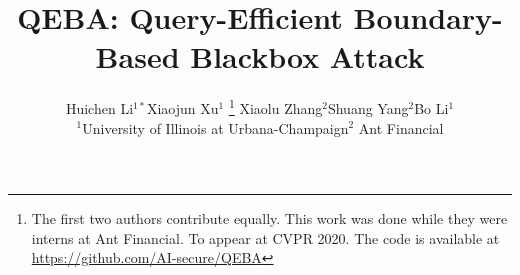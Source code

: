 \documentclass[10pt,twocolumn,letterpaper]{article}
\begin{document}
\title{QEBA: Query-Efficient Boundary-Based Blackbox Attack}
\author{Huichen Li$^{1*}$\quad Xiaojun Xu$^{1}$
\thanks{The first two authors contribute equally. This work was done while they were interns at Ant Financial. To appear at CVPR 2020. The code is available at \url{https://github.com/AI-secure/QEBA}} %
\quad Xiaolu Zhang$^{2}$\quad Shuang Yang$^{2}$\quad Bo Li$^{1}$
\\
$^{1}$University of Illinois at Urbana-Champaign\quad $^{2}$ Ant Financial
}

\maketitle
\thispagestyle{empty}
\end{document}

